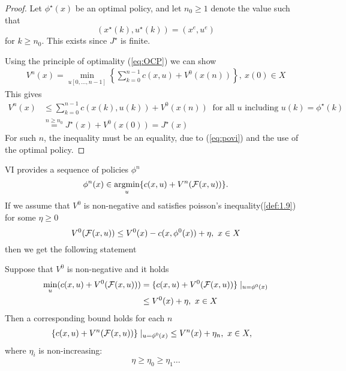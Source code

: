 \begin{proof}
    Let \(\phi^\star(x)\) be an optimal policy, and let 
    \(n_0\geq 1\) denote the value such that 
    \[(x^\star(k),u^\star(k))=(x^e,u^e)\]
    for \(k\geq n_0\). This exists since \(J^\star\) is finite.

    Using the principle of optimality (\ref{eq:OCP}) %
     we can show
    \begin{align}\label{eq:povi}
        V^n(x)=\min_{u[0,\dots,n-1]} \left\{\sum_{k=0}^{n-1} c(x,u)+V^0(x(n)) \right\},\ x(0)\in X 
    \end{align}
    This gives 
    \begin{align*}
        V^n(x) & \leq \sum_{k=0}^{n-1}c(x(k),u(k))+V^0(x(n))\ \text{ for all } u \text{ including }u(k)=\phi^\star(k) \\
               &\stackrel{n\geq n_0}{=}J^\star(x)+V^0(x(0))=J^\star(x)
    \end{align*}
    For such \(n\), the inequality must be an equality, due to (\ref{eq:povi}) and the use 
    of the optimal policy.
\end{proof}

VI provides a sequence of policies \(\phi^n\)
\[\phi^n(x)\in\operatorname*{\text{argmin}}_{u}\{c(x,u)+V^n(\mathcal{F}(x,u))\}.\]
If we assume that \(V^0\) is non-negative and satisfies poisson's inequality(\ref{def:1.9}) for some 
\(\eta\geq 0\)
\[V^0(\mathcal{F}(x,u))\leq V^0(x)-c(x,\phi^0(x))+\eta,\ x\in X\]
then we get the following statement 
\begin{proposition}\label{prop:1.16}
    Suppose that \(V^0\) is non-negative and it holds 
    \begin{align*}
        \min_u (c(x,u)+V^0(\mathcal{F}(x,u)))&=\{c(x,u)+V^0(\mathcal{F}(x,u))\}\mid_{u=\phi^0(x)}\\
        &\leq V^0(x)+\eta,\ x\in X
    \end{align*}
    Then a corresponding bound holds for each \(n\)
    \begin{align*}
        \{c(x,u)+V^n(\mathcal{F}(x,u))\}\mid_{u=\phi^0(x)} & \leq V^n(x)+\eta_n,\ x\in X,
    \end{align*}
    where \(\eta_i\) is non-increasing:
    \[\eta\geq \eta_0\geq \eta_1\dots\]
\end{proposition}

